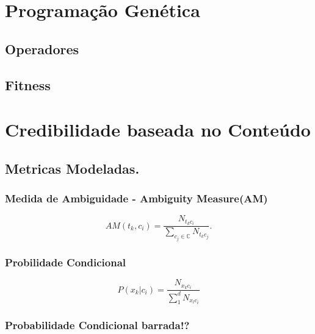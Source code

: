 
\section{Programação Genética}

\subsection{Operadores}

\subsection{Fitness}


\section{Credibilidade baseada no Conteúdo}
\label{sec::pg_cred_baseada_conteudo}

\subsection{Metricas Modeladas.}
\label{subsec::pg_metricas_conteudo}


\subsubsection{Medida de Ambiguidade - Ambiguity Measure(AM)}
\label{subsubsection::am}

\cite{Mengle08}

\begin{equation}\label{eqn::am}
   AM(t_k, c_i) = \frac{ N_{t_{k}c_{i}}}{\sum_{c_j \in \mathbb{C}} N_{t_{k}c_{j}}}.
\end{equation}


\subsubsection{Probilidade Condicional}
\label{subsubsection::pc}

\begin{equation}\label{eqn::pctalquec}
    P(x_k|c_i) = \frac{ N_{x_{k}c_{i}} }{ \sum\limits^{d}_{1} { } N_{x_{l}c_{i}} } 
\end{equation}

\subsubsection{Probabilidade Condicional barrada!?}
\label{subsubsection::pc'}

